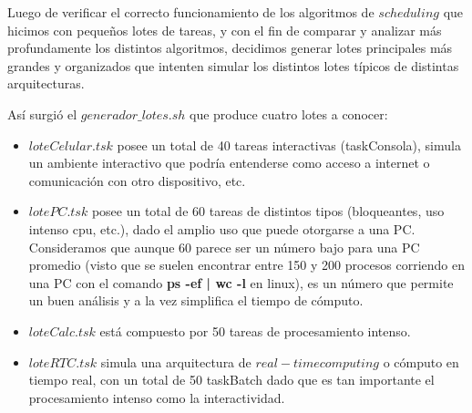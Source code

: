 Luego de verificar el correcto funcionamiento de los algoritmos de $scheduling$ que hicimos con peque\~nos lotes de tareas, y con el fin de comparar y analizar m\'as profundamente los distintos algoritmos, decidimos generar lotes principales m\'as grandes y organizados que intenten simular los distintos lotes t\'ipicos de distintas arquitecturas.

As\'i surgi\'o el $generador\_lotes.sh$ que produce cuatro lotes a conocer:

\begin{itemize}
	\item $loteCelular.tsk$ posee un total de 40 tareas interactivas (taskConsola), simula un ambiente interactivo que podr\'ia entenderse como acceso a internet o comunicaci\'on con otro dispositivo, etc.
	\item $lotePC.tsk$ posee un total de 60 tareas de distintos tipos (bloqueantes, uso intenso cpu, etc.), dado el amplio uso que puede otorgarse a una PC. Consideramos que aunque 60 parece ser un n\'umero bajo para una PC promedio (visto que se suelen encontrar entre 150 y 200 procesos corriendo en una PC con el comando \textbf{ps -ef | wc -l} en linux), es un n\'umero que permite un buen an\'alisis y a la vez simplifica el tiempo de c\'omputo.
	\item $loteCalc.tsk$ est\'a compuesto por 50 tareas de procesamiento intenso.
	\item $loteRTC.tsk$ simula una arquitectura de $real-time computing$ o c\'omputo en tiempo real, con un total de 50 taskBatch dado que es tan importante el procesamiento intenso como la interactividad.
\end{itemize}

